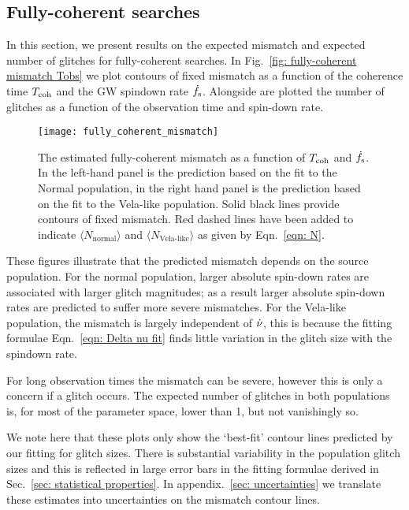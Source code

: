 \documentclass[../full_thesis/full_thesis.tex]{subfiles}
\begin{document}
\subsection{Fully-coherent searches}

In this section, we present results on the expected mismatch and expected number
of glitches for fully-coherent searches. In Fig.~\ref{fig: fully-coherent mismatch
Tobs} we plot contours of fixed mismatch as a function of the coherence time
$T_{\mathrm{coh}}$ and the GW spindown rate $\dot{f}_{\textrm{s}}$. Alongside are plotted the number of
glitches as a function of the observation time and spin-down rate.
\begin{figure}[htb] \centering
\texttt{[image: fully\_coherent\_mismatch]}
\caption{The estimated fully-coherent
mismatch as a function of $T_{\mathrm{coh}}$ and $\dot{f}_{\textrm{s}}$. In the left-hand panel is the prediction based on the fit
to the Normal population, in the right hand panel is the prediction based on
the fit to the Vela-like population. Solid black lines provide contours of fixed
mismatch. Red dashed lines have been added to indicate $\langle
N_\textrm{normal} \rangle$ and $\langle N_\textrm{Vela-like} \rangle$ as given
by Eqn.~\eqref{eqn: N}.}
\label{fig: fully-coherent mismatch Tobs}
\end{figure}

These figures illustrate that the predicted mismatch depends on the source
population. For the normal population, larger absolute spin-down rates are
associated with larger glitch magnitudes; as a result larger absolute spin-down
rates are predicted to suffer more severe mismatches. For the Vela-like
population, the mismatch is largely independent of $\dot{\nu}$, this is because
the fitting formulae Eqn.~\eqref{eqn: Delta nu fit} finds little variation in
the glitch size with the spindown rate.

For long observation times the mismatch can be severe, however this is only a
concern if a glitch occurs. The expected number of glitches in both populations
is, for most of the parameter space, lower than 1, but not vanishingly so.

We note here that these plots only show the `best-fit' contour lines predicted
by our fitting for glitch sizes. There is substantial variability in the population
glitch sizes and this is reflected in large error bars in the fitting formulae
derived in Sec.~\ref{sec: statistical properties}. In appendix.~\ref{sec: uncertainties}
we translate these estimates into uncertainties on the mismatch contour lines.
\end{document}
